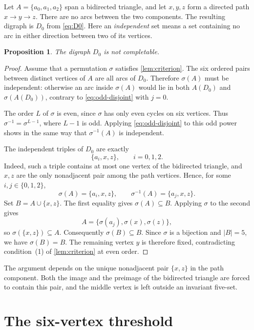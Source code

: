 \documentclass[11pt,reqno]{amsart}
\newtheorem{proposition}[theorem]{Proposition}
\theoremstyle{definition}
\begin{document}
Let \(A=\{a_0,a_1,a_2\}\) span a bidirected triangle, and let \(x,y,z\) form a directed path \(x\to y\to z\). There are no arcs between the two components. The resulting digraph is \(D_0\) from \eqref{eq:D0}. Here an \emph{independent} set means a set containing no arc in either direction between two of its vertices.

\begin{proposition}\label{prop:D0}
The digraph \(D_0\) is not completable.
\end{proposition}

\begin{proof}
Assume that a permutation \(\sigma\) satisfies \cref{lem:criterion}. The six ordered pairs between distinct vertices of \(A\) are all arcs of \(D_0\). Therefore \(\sigma(A)\) must be independent: otherwise an arc inside \(\sigma(A)\) would lie in both \(A(D_0)\) and \(\sigma(A(D_0))\), contrary to \eqref{eq:odd-disjoint} with \(j=0\).

The order \(L\) of \(\sigma\) is even, since \(\sigma\) has only even cycles on six vertices. Thus \(\sigma^{-1}=\sigma^{L-1}\), where \(L-1\) is odd. Applying \eqref{eq:odd-disjoint} to this odd power shows in the same way that \(\sigma^{-1}(A)\) is independent.

The independent triples of \(D_0\) are exactly
\begin{equation}\label{eq:independent-triples}
\{a_i,x,z\},\qquad i=0,1,2.
\end{equation}
Indeed, such a triple contains at most one vertex of the bidirected triangle, and \(x,z\) are the only nonadjacent pair among the path vertices. Hence, for some \(i,j\in\{0,1,2\}\),
\[
\sigma(A)=\{a_i,x,z\},
\qquad
\sigma^{-1}(A)=\{a_j,x,z\}.
\]
Set \(B=A\cup\{x,z\}\). The first equality gives \(\sigma(A)\subseteq B\). Applying \(\sigma\) to the second gives
\[
A=\{\sigma(a_j),\sigma(x),\sigma(z)\},
\]
so \(\sigma(\{x,z\})\subseteq A\). Consequently \(\sigma(B)\subseteq B\). Since \(\sigma\) is a bijection and \(|B|=5\), we have \(\sigma(B)=B\). The remaining vertex \(y\) is therefore fixed, contradicting condition~(1) of \cref{lem:criterion} at even order.
\end{proof}

The argument depends on the unique nonadjacent pair \(\{x,z\}\) in the path component. Both the image and the preimage of the bidirected triangle are forced to contain this pair, and the middle vertex is left outside an invariant five-set.

\section{The six-vertex threshold}\label{sec:threshold}
\end{document}
